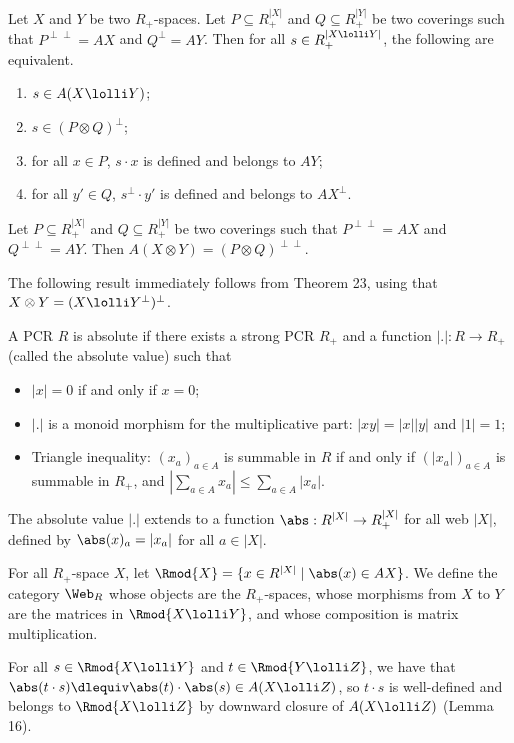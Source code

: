 \begin{originalthm}
Let $X$ and $Y$ be two $R_+$-spaces. Let $P\subseteq R_+^{|X|}$ and $Q\subseteq R_+^{|Y|}$ be two coverings such that $P^{\perp\perp}=AX$ and $Q^\perp=AY$. Then for all $s\in R_+^{|X\lolli Y|}$, the following are equivalent.
\begin{enumerate}\item $s\in A(X\lolli Y)$;\item $s\in(P\otimes Q)^\perp$;\item for all $x\in P$, $s\cdot x$ is defined and belongs to $AY$;\item for all $y'\in Q$, $s^\perp\cdot y'$ is defined and belongs to $AX^\perp$.\end{enumerate}
\end{originalthm}
\begin{originalcor}[24] Let $P\subseteq R_+^{|X|}$ and $Q\subseteq R_+^{|Y|}$ be two coverings such that $P^{\perp\perp}=AX$ and $Q^{\perp\perp}=AY$. Then $A(X\otimes Y)=(P\otimes Q)^{\perp\perp}$.\end{originalcor}
The following result immediately follows from Theorem 23, using that $X\otimes Y=(X\lolli Y^\perp)^\perp$.
\begin{originaldef}[26] A PCR $R$ is absolute if there exists a strong PCR $R_+$ and a function $|.|:R\to R_+$ (called the absolute value) such that
\begin{itemize}\item $|x|=0$ if and only if $x=0$;\item $|.|$ is a monoid morphism for the multiplicative part: $|xy|=|x||y|$ and $|1|=1$;\item Triangle inequality: $(x_a)_{a\in A}$ is summable in $R$ if and only if $(|x_a|)_{a\in A}$ is summable in $R_+$, and $|\sum_{a\in A}x_a|\leq\sum_{a\in A}|x_a|$.\end{itemize}
\end{originaldef}
The absolute value $|.|$ extends to a function $\abs:R^{|X|}\to R_+^{|X|}$ for all web $|X|$, defined by $\abs(x)_a=|x_a|$ for all $a\in|X|$.
\begin{originaldef}[28] For all $R_+$-space $X$, let $\Rmod{X}=\{x\in R^{|X|}\mid\abs(x)\in AX\}$. We define the category $\Web_R$ whose objects are the $R_+$-spaces, whose morphisms from $X$ to $Y$ are the matrices in $\Rmod{X\lolli Y}$, and whose composition is matrix multiplication.\end{originaldef}
For all $s\in\Rmod{X\lolli Y}$ and $t\in\Rmod{Y\lolli Z}$, we have that $\abs(t\cdot s)\dlequiv\abs(t)\cdot\abs(s)\in A(X\lolli Z)$, so $t\cdot s$ is well-defined and belongs to $\Rmod{X\lolli Z}$ by downward closure of $A(X\lolli Z)$ (Lemma 16).
